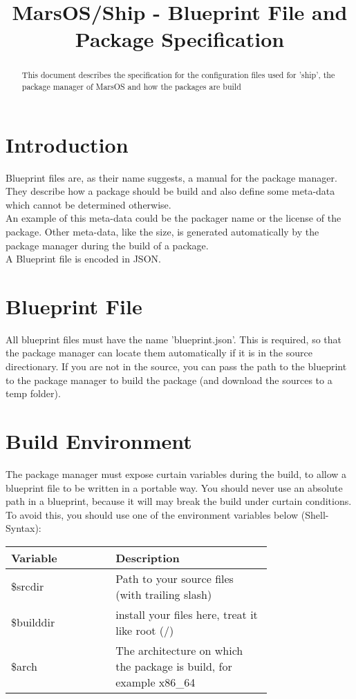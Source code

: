 \documentclass[]{article}
\title{MarsOS/Ship - Blueprint File and Package Specification}
\begin{document}
\maketitle

\begin{abstract}
\noindent This document describes the specification for the configuration files used for 'ship', the package manager of MarsOS and how the packages are build
\end{abstract}
\vspace{25px}
\begin{multicols}{2}
	\section{Introduction}
	Blueprint files are, as their name suggests, a manual
	for the package manager. They describe how a package
	should be build and also define some meta-data which
	cannot be determined otherwise.\\
	An example of this meta-data could be the packager name
	or the license of the package. Other meta-data, like the size, is generated automatically by the package
	manager during the build of a package.\\
	A Blueprint file is encoded in JSON.
	\section{Blueprint File}
	All blueprint files must have the name 'blueprint.json'.
	This is required, so that the package manager can
	locate them automatically if it is in the source
	directionary. If you are not in the source, you can
	pass the path to the blueprint to the package manager
	to build the package (and download the sources to
	a temp folder).
	\section{Build Environment}
	The package manager must expose curtain variables
	during the build, to allow a blueprint file to be
	written in a portable way.
	You should never use an absolute path in a blueprint,
	because it will may break the build under curtain
	conditions. To avoid this, you should use one of
	the environment variables below (Shell-Syntax):

	\begin{tabular}{|p{0.3\linewidth}|p{0.45\linewidth}|}
		\hline
		Variable & Description \\\hline
		\$srcdir & Path to your source files (with trailing slash) \\\hline
		\$builddir & install your files here, treat it like root (/) \\\hline
		\$arch & The architecture on which the package is build, for example x86\_64 \\\hline
	\end{tabular}
	\pagebreak

\end{multicols}
\end{document}
